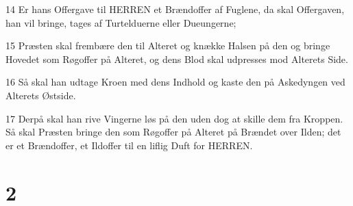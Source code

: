 \par 14 Er hans Offergave til HERREN et Brændoffer af Fuglene, da skal Offergaven, han vil bringe, tages af Turtelduerne eller Dueungerne;
\par 15 Præsten skal frembære den til Alteret og knække Halsen på den og bringe Hovedet som Røgoffer på Alteret, og dens Blod skal udpresses mod Alterets Side.
\par 16 Så skal han udtage Kroen med dens Indhold og kaste den på Askedyngen ved Alterets Østside.
\par 17 Derpå skal han rive Vingerne løs på den uden dog at skille dem fra Kroppen. Så skal Præsten bringe den som Røgoffer på Alteret på Brændet over Ilden; det er et Brændoffer, et Ildoffer til en liflig Duft for HERREN.

\chapter{2}

